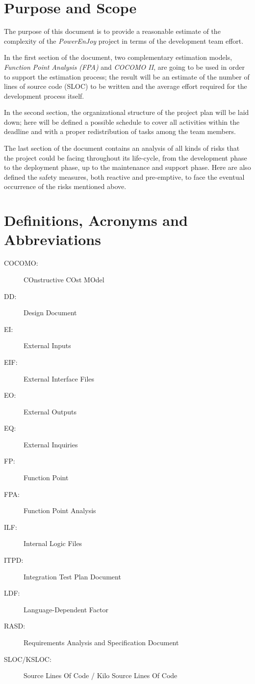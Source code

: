 \section{Purpose and Scope}
The purpose of this document is to provide a reasonable estimate of the complexity of the \textit{PowerEnJoy} project in terms of the development team effort.

In the first section of the document, two complementary estimation models, \textit{Function Point Analysis (FPA)} and \textit{COCOMO II}, are going to be used in order to support the estimation process; the result will be an estimate of the number of lines of source code (SLOC) to be written and the average effort required for the development process itself.

In the second section, the organizational structure of the project plan will be laid down; here will be defined a possible schedule to cover all activities within the deadline and with a proper redistribution of tasks among the team members.

The last section of the document contains an analysis of all kinds of risks that the project could be facing throughout its life-cycle, from the development phase to the deployment phase, up to the maintenance and support phase. Here are also defined the safety measures, both reactive and pre-emptive, to face the eventual occurrence of the risks mentioned above.

\section{Definitions, Acronyms and Abbreviations}
\begin{description}
\item[COCOMO:] COnstructive COst MOdel
\item[DD:] Design Document
\item[EI:] External Inputs
\item[EIF:] External Interface Files
\item[EO:] External Outputs
\item[EQ:] External Inquiries
\item[FP:] Function Point
\item[FPA:] Function Point Analysis
\item[ILF:] Internal Logic Files
\item[ITPD:] Integration Test Plan Document
\item[LDF:] Language-Dependent Factor
\item[RASD:] Requirements Analysis and Specification Document
\item[SLOC/KSLOC:] Source Lines Of Code / Kilo Source Lines Of Code
\end{description}

